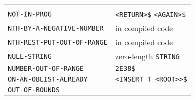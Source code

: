 \documentclass[a4paper,]{article}
\begin{document}
\begin{longtable}[]{@{}ll@{}}
\begin{minipage}[t]{0.36\columnwidth}
\end{minipage}\tabularnewline
\begin{minipage}[t]{0.58\columnwidth}\raggedright\strut
\texttt{NOT-IN-PROG}\strut
\end{minipage} & \begin{minipage}[t]{0.36\columnwidth}\raggedright\strut
\texttt{\textless{}RETURN\textgreater{}\$} \texttt{\textless{}AGAIN\textgreater{}\$}\strut
\end{minipage}\tabularnewline
\begin{minipage}[t]{0.58\columnwidth}\raggedright\strut
\texttt{NTH-BY-A-NEGATIVE-NUMBER}\strut
\end{minipage} & \begin{minipage}[t]{0.36\columnwidth}\raggedright\strut
in compiled code\strut
\end{minipage}\tabularnewline
\begin{minipage}[t]{0.58\columnwidth}\raggedright\strut
\texttt{NTH-REST-PUT-OUT-OF-RANGE}\strut
\end{minipage} & \begin{minipage}[t]{0.36\columnwidth}\raggedright\strut
in compiled code\strut
\end{minipage}\tabularnewline
\begin{minipage}[t]{0.58\columnwidth}\raggedright\strut
\texttt{NULL-STRING}\strut
\end{minipage} & \begin{minipage}[t]{0.36\columnwidth}\raggedright\strut
zero-length \texttt{STRING}\strut
\end{minipage}\tabularnewline
\begin{minipage}[t]{0.58\columnwidth}\raggedright\strut
\texttt{NUMBER-OUT-OF-RANGE}\strut
\end{minipage} & \begin{minipage}[t]{0.36\columnwidth}\raggedright\strut
\texttt{2E38\$}\strut
\end{minipage}\tabularnewline
\begin{minipage}[t]{0.58\columnwidth}\raggedright\strut
\texttt{ON-AN-OBLIST-ALREADY}\strut
\end{minipage} & \begin{minipage}[t]{0.36\columnwidth}\raggedright\strut
\texttt{\textless{}INSERT\ T\ \textless{}ROOT\textgreater{}\textgreater{}\$}\strut
\end{minipage}\tabularnewline
\begin{minipage}[t]{0.58\columnwidth}\raggedright\strut
\texttt{OUT-OF-BOUNDS}\strut
\end{minipage} & \begin{minipage}[t]{0.36\columnwidth}\raggedright\strut

\end{minipage}
\end{longtable}
\end{document}
